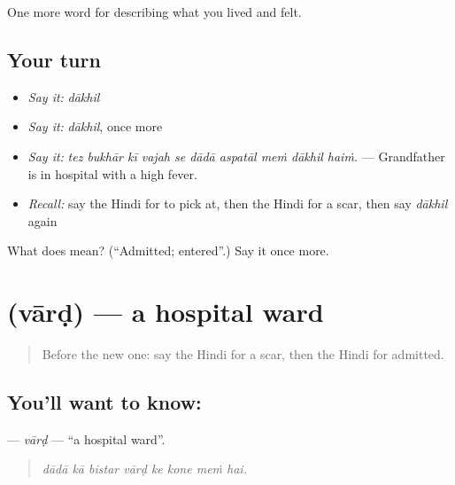 \begin{grammarlens}[title={What you've built}]
One more word for describing what you lived and felt.
\end{grammarlens}

\subsection*{Your turn}
\begin{itemize}
\raggedright
  \item \emph{Say it:} \emph{dākhil}
  \item \emph{Say it:} \emph{dākhil}, once more
  \item \emph{Say it:} \emph{tez bukhār kī vajah se dādā aspatāl meṁ dākhil haiṁ.} — Grandfather is in hospital with a high fever.
  \item \emph{Recall:} say the Hindi for to pick at, then the Hindi for a scar, then say \emph{dākhil} again
\end{itemize}

\begin{tcolorbox}[breakable,colback=teal!4,colframe=teal!35!black,title={Before you move on}]
What does  mean? (\textquotedblleft{}Admitted; entered\textquotedblright{}.) Say it once more.
\end{tcolorbox}
\section[\texorpdfstring{\hi{वार्ड} (vārḍ)}{वार्ड (vārḍ)}]{ (vārḍ) — a hospital ward}

\label{lesson:HI-C491-vard}



\begin{quote}
Before the new one: say the Hindi for a scar, then the Hindi for admitted.
\end{quote}

\subsection*{You'll want to know: }
\textbf{} — \emph{vārḍ} — \textquotedblleft{}a hospital ward\textquotedblright{}.

\begin{quote}
       
\end{quote}

\begin{quote}
\emph{dādā kā bistar vārḍ ke kone meṁ hai.}
\end{quote}

